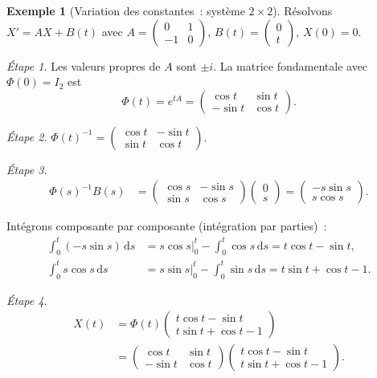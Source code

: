 \documentclass[12pt,a4paper,openany]{book}
\theoremstyle{definition}
\newtheorem{exemple}[definition]{Exemple}
\theoremstyle{plain}
\theoremstyle{remark}
\newcommand{\dd}{\mathrm{d}}
\begin{document}
\begin{exemple}[Variation des constantes~: système $2\times 2$]\label{ex:var-cst-syst-2x2}
  Résolvons $X' = AX + B(t)$ avec
  $A = \begin{pmatrix} 0 & 1 \\ -1 & 0 \end{pmatrix}$,
  $B(t) = \begin{pmatrix} 0 \\ t \end{pmatrix}$, $X(0) = 0$.

  \emph{Étape 1.} Les valeurs propres de $A$ sont $\pm i$.
  La matrice fondamentale avec $\Phi(0) = I_2$ est
  \[
    \Phi(t) = e^{tA} = \begin{pmatrix}
      \cos t & \sin t \\ -\sin t & \cos t
    \end{pmatrix}.
  \]

  \emph{Étape 2.}
  $\Phi(t)^{-1} = \begin{pmatrix}
    \cos t & -\sin t \\ \sin t & \cos t
  \end{pmatrix}$.

  \emph{Étape 3.}
  \begin{align*}
    \Phi(s)^{-1}B(s) &= \begin{pmatrix}
      \cos s & -\sin s \\ \sin s & \cos s
    \end{pmatrix}\begin{pmatrix}0\\s\end{pmatrix}
    = \begin{pmatrix} -s\sin s \\ s\cos s \end{pmatrix}.
  \end{align*}

  Intégrons composante par composante (intégration par parties)~:
  \begin{align*}
    \int_0^t (-s\sin s)\,\dd s &= s\cos s\big|_0^t - \int_0^t \cos s\,\dd s
      = t\cos t - \sin t, \\
    \int_0^t s\cos s\,\dd s &= s\sin s\big|_0^t - \int_0^t \sin s\,\dd s
      = t\sin t + \cos t - 1.
  \end{align*}

  \emph{Étape 4.}
  \begin{align*}
    X(t) &= \Phi(t)\begin{pmatrix}t\cos t - \sin t \\ t\sin t + \cos t - 1\end{pmatrix} \\
    &= \begin{pmatrix}
      \cos t & \sin t \\ -\sin t & \cos t
    \end{pmatrix}
    \begin{pmatrix}t\cos t - \sin t \\ t\sin t + \cos t - 1\end{pmatrix}.
  \end{align*}


\end{exemple}
\end{document}
